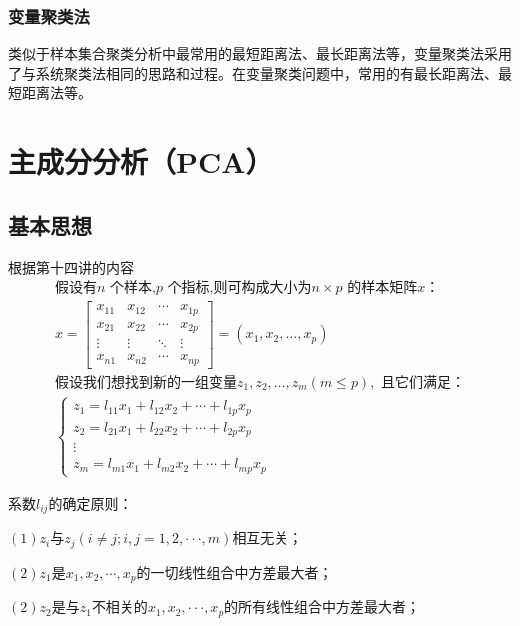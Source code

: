 \documentclass[12pt]{ctexart}
\numberwithin{equation}{section} %
\begin{document}
\subsubsection{变量聚类法}

类似于样本集合聚类分析中最常用的最短距离法、最长距离法等，变量聚类法采用了与系统聚类法相同的思路和过程。在变量聚类问题中，常用的有最长距离法、最短距离法等。
\section{主成分分析（PCA）}
\subsection{基本思想}
根据\cite{清风}第十四讲的内容
\begin{equation}
\begin{gathered}
  \text{假设有} n \text{ 个样本,} p \text{ 个指标,则可构成大小为} n \times p \text{ 的样本矩阵} x \text{：} \\
  x = 
  \begin{bmatrix}
  x_{11} & x_{12} & \cdots & x_{1p} \\
  x_{21} & x_{22} & \cdots & x_{2p} \\
  \vdots & \vdots & \ddots & \vdots \\
  x_{n1} & x_{n2} & \cdots & x_{np}
  \end{bmatrix}
  = (x_1, x_2, \ldots, x_p) \\
  \text{假设我们想找到新的一组变量} z_1, z_2, \ldots, z_m (m \leq p), \text{ 且它们满足：} \\
  \left\{
  \begin{array}{l}
  z_1 = l_{11}x_1 + l_{12}x_2 + \cdots + l_{1p}x_p \\
  z_2 = l_{21}x_1 + l_{22}x_2 + \cdots + l_{2p}x_p \\
  \vdots \\
  z_m = l_{m1}x_1 + l_{m2}x_2 + \cdots + l_{mp}x_p
  \end{array}
  \right.
  \end{gathered}
\end{equation}

系数$l_{ij}$的确定原则：

$(1)z_{i}$与$z_j(i\neq j;i,j=1,2,\cdotp\cdotp\cdotp,m)$相互无关；

$(2)z_1$是$x_1,x_2,\cdots,x_p$的一切线性组合中方差最大者；

$(2)z_2$是与$z_1$不相关的$x_1,x_2,\cdotp\cdotp\cdotp,x_p$的所有线性组合中方差最大者；
\end{document}
